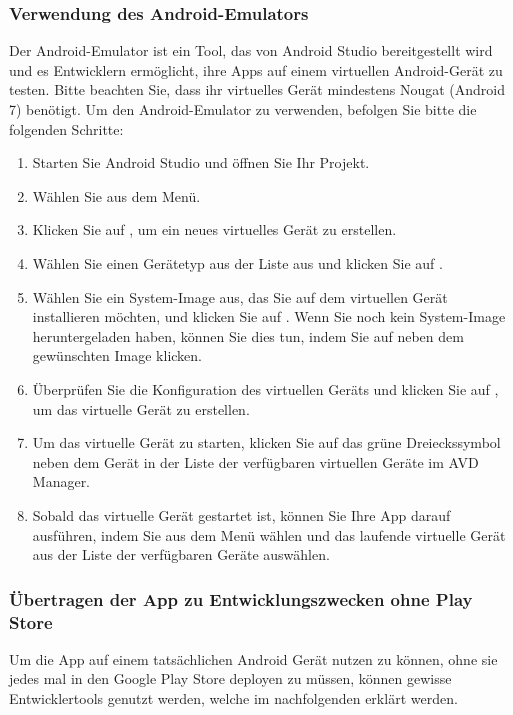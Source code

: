 \subsubsection{Verwendung des Android-Emulators}
Der Android-Emulator ist ein Tool, das von Android Studio bereitgestellt wird und es Entwicklern ermöglicht, ihre Apps auf einem virtuellen Android-Gerät zu testen. Bitte beachten Sie, dass ihr virtuelles Gerät mindestens Nougat (Android 7) benötigt. Um den Android-Emulator zu verwenden, befolgen Sie bitte die folgenden Schritte:\newline
\begin{enumerate}
    \item Starten Sie Android Studio und öffnen Sie Ihr Projekt.
    \item Wählen Sie  aus dem  Menü.
    \item Klicken Sie auf , um ein neues virtuelles Gerät zu erstellen.
    \item Wählen Sie einen Gerätetyp aus der Liste aus und klicken Sie auf .
    \item Wählen Sie ein System-Image aus, das Sie auf dem virtuellen Gerät installieren möchten, und klicken Sie auf . Wenn Sie noch kein System-Image heruntergeladen haben, können Sie dies tun, indem Sie auf  neben dem gewünschten Image klicken.
    \item Überprüfen Sie die Konfiguration des virtuellen Geräts und klicken Sie auf , um das virtuelle Gerät zu erstellen.
    \item Um das virtuelle Gerät zu starten, klicken Sie auf das grüne Dreieckssymbol neben dem Gerät in der Liste der verfügbaren virtuellen Geräte im AVD Manager.
    \item Sobald das virtuelle Gerät gestartet ist, können Sie Ihre App darauf ausführen, indem Sie  aus dem  Menü wählen und das laufende virtuelle Gerät aus der Liste der verfügbaren Geräte auswählen.
\end{enumerate}

\subsubsection{Übertragen der App zu Entwicklungszwecken ohne Play Store}
Um die App auf einem tatsächlichen Android Gerät nutzen zu können, ohne sie jedes mal in den Google Play Store deployen zu müssen, können gewisse Entwicklertools genutzt werden, welche im nachfolgenden erklärt werden.
